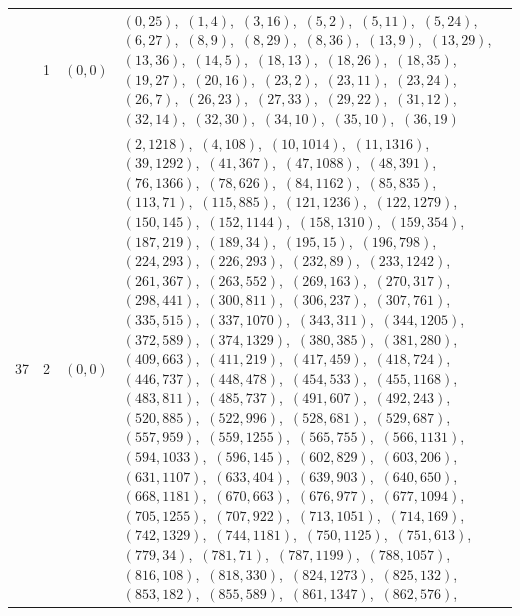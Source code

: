 \documentclass[11pt]{article}
\begin{document}
\begin{longtable}{@{}rrl>{\raggedright\arraybackslash}p{}@{}}
\addlinespace[3pt]
37 & 1 & $(0,0)$ & $(0,25)$,\allowbreak\ $(1,4)$,\allowbreak\ $(3,16)$,\allowbreak\ $(5,2)$,\allowbreak\ $(5,11)$,\allowbreak\ $(5,24)$,\allowbreak\ $(6,27)$,\allowbreak\ $(8,9)$,\allowbreak\ $(8,29)$,\allowbreak\ $(8,36)$,\allowbreak\ $(13,9)$,\allowbreak\ $(13,29)$,\allowbreak\ $(13,36)$,\allowbreak\ $(14,5)$,\allowbreak\ $(18,13)$,\allowbreak\ $(18,26)$,\allowbreak\ $(18,35)$,\allowbreak\ $(19,27)$,\allowbreak\ $(20,16)$,\allowbreak\ $(23,2)$,\allowbreak\ $(23,11)$,\allowbreak\ $(23,24)$,\allowbreak\ $(26,7)$,\allowbreak\ $(26,23)$,\allowbreak\ $(27,33)$,\allowbreak\ $(29,22)$,\allowbreak\ $(31,12)$,\allowbreak\ $(32,14)$,\allowbreak\ $(32,30)$,\allowbreak\ $(34,10)$,\allowbreak\ $(35,10)$,\allowbreak\ $(36,19)$\\
37 & 2 & $(0,0)$ & $(2,1218)$,\allowbreak\ $(4,108)$,\allowbreak\ $(10,1014)$,\allowbreak\ $(11,1316)$,\allowbreak\ $(39,1292)$,\allowbreak\ $(41,367)$,\allowbreak\ $(47,1088)$,\allowbreak\ $(48,391)$,\allowbreak\ $(76,1366)$,\allowbreak\ $(78,626)$,\allowbreak\ $(84,1162)$,\allowbreak\ $(85,835)$,\allowbreak\ $(113,71)$,\allowbreak\ $(115,885)$,\allowbreak\ $(121,1236)$,\allowbreak\ $(122,1279)$,\allowbreak\ $(150,145)$,\allowbreak\ $(152,1144)$,\allowbreak\ $(158,1310)$,\allowbreak\ $(159,354)$,\allowbreak\ $(187,219)$,\allowbreak\ $(189,34)$,\allowbreak\ $(195,15)$,\allowbreak\ $(196,798)$,\allowbreak\ $(224,293)$,\allowbreak\ $(226,293)$,\allowbreak\ $(232,89)$,\allowbreak\ $(233,1242)$,\allowbreak\ $(261,367)$,\allowbreak\ $(263,552)$,\allowbreak\ $(269,163)$,\allowbreak\ $(270,317)$,\allowbreak\ $(298,441)$,\allowbreak\ $(300,811)$,\allowbreak\ $(306,237)$,\allowbreak\ $(307,761)$,\allowbreak\ $(335,515)$,\allowbreak\ $(337,1070)$,\allowbreak\ $(343,311)$,\allowbreak\ $(344,1205)$,\allowbreak\ $(372,589)$,\allowbreak\ $(374,1329)$,\allowbreak\ $(380,385)$,\allowbreak\ $(381,280)$,\allowbreak\ $(409,663)$,\allowbreak\ $(411,219)$,\allowbreak\ $(417,459)$,\allowbreak\ $(418,724)$,\allowbreak\ $(446,737)$,\allowbreak\ $(448,478)$,\allowbreak\ $(454,533)$,\allowbreak\ $(455,1168)$,\allowbreak\ $(483,811)$,\allowbreak\ $(485,737)$,\allowbreak\ $(491,607)$,\allowbreak\ $(492,243)$,\allowbreak\ $(520,885)$,\allowbreak\ $(522,996)$,\allowbreak\ $(528,681)$,\allowbreak\ $(529,687)$,\allowbreak\ $(557,959)$,\allowbreak\ $(559,1255)$,\allowbreak\ $(565,755)$,\allowbreak\ $(566,1131)$,\allowbreak\ $(594,1033)$,\allowbreak\ $(596,145)$,\allowbreak\ $(602,829)$,\allowbreak\ $(603,206)$,\allowbreak\ $(631,1107)$,\allowbreak\ $(633,404)$,\allowbreak\ $(639,903)$,\allowbreak\ $(640,650)$,\allowbreak\ $(668,1181)$,\allowbreak\ $(670,663)$,\allowbreak\ $(676,977)$,\allowbreak\ $(677,1094)$,\allowbreak\ $(705,1255)$,\allowbreak\ $(707,922)$,\allowbreak\ $(713,1051)$,\allowbreak\ $(714,169)$,\allowbreak\ $(742,1329)$,\allowbreak\ $(744,1181)$,\allowbreak\ $(750,1125)$,\allowbreak\ $(751,613)$,\allowbreak\ $(779,34)$,\allowbreak\ $(781,71)$,\allowbreak\ $(787,1199)$,\allowbreak\ $(788,1057)$,\allowbreak\ $(816,108)$,\allowbreak\ $(818,330)$,\allowbreak\ $(824,1273)$,\allowbreak\ $(825,132)$,\allowbreak\ $(853,182)$,\allowbreak\ $(855,589)$,\allowbreak\ $(861,1347)$,\allowbreak\ $(862,576)$,\allowbreak\ 
\end{longtable}
\end{document}
